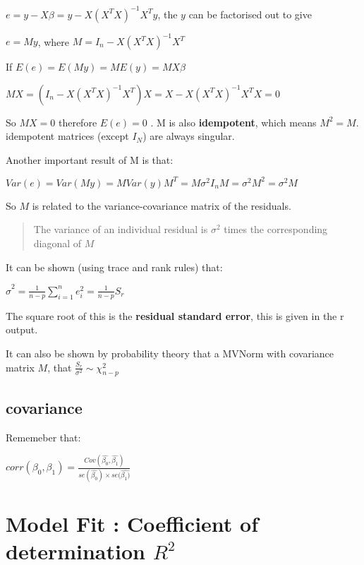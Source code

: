 \documentclass[
  letterpaper,
  DIV=11,
  numbers=noendperiod]{scrreprt}
\begin{document}
\(e = y-X\beta = y - X(X^TX)^{-1}X^Ty\), the \(y\) can be factorised out
to give

\(e = My\), where \(M = I_n - X(X^TX)^{-1}X^T\)

If \(E(e) = E(My) = ME(y) = MX\beta\)

\(MX = (I_n - X(X^TX)^{-1}X^T)X = X - X(X^TX)^{-1}X^TX = 0\)

So \(MX = 0\) therefore \(E(e) = 0\) . M is also \textbf{idempotent},
which means \(M^2 = M\). idempotent matrices (except \(I_N\)) are always
singular.

Another important result of M is that:

\(Var(e) = Var(My) = MVar(y)M^T = M\sigma^2I_nM =\sigma^2M^2 = \sigma^2M\)

So \(M\) is related to the variance-covariance matrix of the residuals.

\begin{quote}
The variance of an individual residual is \(\sigma^2\) times the
corresponding diagonal of \(M\)
\end{quote}

It can be shown (using trace and rank rules) that:

\(\hat{\sigma}^2 = \frac{1}{n-p}\sum^n_{i=1}e_i^2 = \frac{1}{n-p}S_r\)

The square root of this is the \textbf{residual standard error}, this is
given in the r output.

It can also be shown by probability theory that a MVNorm with covariance
matrix \(M\), that \(\frac{S_r}{\sigma^2} \sim \chi^2_{n-p}\)

\hypertarget{covariance}{%
\subsection{\texorpdfstring{\hat{\beta}
covariance}{ covariance}}\label{covariance}}

Rememeber that:

\(corr(\beta_0, \beta_1) = \frac{Cov(\hat{\beta_0},\hat{\beta_1})}{se(\hat{\beta_0}) \times se(\hat{\beta_1)}}\)

\hypertarget{model-fit-coefficient-of-determination-r2}{%
\section{\texorpdfstring{Model Fit : Coefficient of determination
\(R^2\)}{Model Fit : Coefficient of determination R\^{}2}}\label{model-fit-coefficient-of-determination-r2}}
\end{document}
